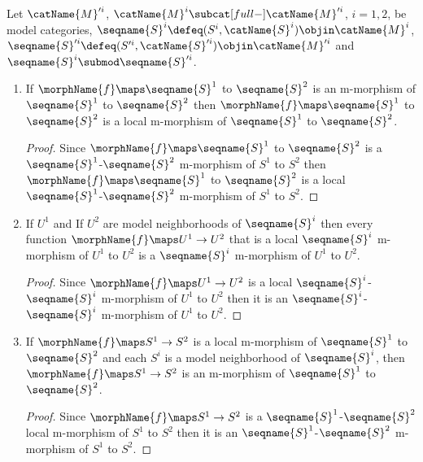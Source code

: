 \documentclass{article}
\begin{document}
\begin{corollary}
\label{cor:modMmorph}
Let $\catName{M}'^i$, $\catName{M}^i \subcat[full-] \catName{M}'^i$,
$i=1,2$, be model categories,
$\seqname{S}^i \defeq (S^i, \catName{S}^i) \objin \catName{M}^i$,
$\seqname{S}'^i \defeq (S'^i, \catName{S}'^i) \objin \catName{M}'^i$
and $\seqname{S}^i \submod \seqname{S}'^i$.

\begin{enumerate}
\item
\label{M-morph:morphislocal}
If $\morphName{f} \maps \seqname{S}^1$ to $\seqname{S}^2$ is an
m-morphism of $\seqname{S}^1$ to $\seqname{S}^2$ then
$\morphName{f} \maps \seqname{S}^1$ to $\seqname{S}^2$ is a local
m-morphism of $\seqname{S}^1$ to $\seqname{S}^2$.

\begin{proof}
Since $\morphName{f} \maps \seqname{S}^1$ to $\seqname{S}^2$ is a
$\seqname{S}^1$-$\seqname{S}^2$ m-morphism of $S^1$ to $S^2$ then
$\morphName{f} \maps \seqname{S}^1$ to $\seqname{S}^2$ is a local
$\seqname{S}^1$-$\seqname{S}^2$ m-morphism of $S^1$ to $S^2$.
\end{proof}

\item
\label{M-morph:sublocalismorph}
If $U^1$ and If $U^2$ are model neighborhoods of $\seqname{S}^i$ then
every function $\morphName{f} \maps U^1 \to U^2$ that is a local
$\seqname{S}^i$ m-morphism of $U^1$ to $U^2$ is a $\seqname{S}^i$
m-morphism of $U^1$ to $U^2$.

\begin{proof}
Since $\morphName{f} \maps U^1 \to U^2$ is a local
$\seqname{S}^i$-$\seqname{S}^i$ m-morphism of $U^1$ to $U^2$ then it is
an $\seqname{S}^i$-$\seqname{S}^i$ m-morphism of $U^1$ to $U^2$.
\end{proof}

\item
\label{M-morph:localismorph}
If $\morphName{f} \maps S^1 \to S^2$ is a local m-morphism of
$\seqname{S}^1$ to $\seqname{S}^2$ and each $S^i$ is a model
neighborhood of $\seqname{S}^i$, then $\morphName{f} \maps S^1 \to S^2$
is an m-morphism of $\seqname{S}^1$ to $\seqname{S}^2$.

\begin{proof}
Since $\morphName{f} \maps S^1 \to S^2$ is a
$\seqname{S}^1$-$\seqname{S}^2$ local m-morphism of $S^1$ to $S^2$ then
it is an $\seqname{S}^1$-$\seqname{S}^2$ m-morphism of $S^1$ to
$S^2$.
\end{proof}


\end{enumerate}
\end{corollary}
\end{document}
